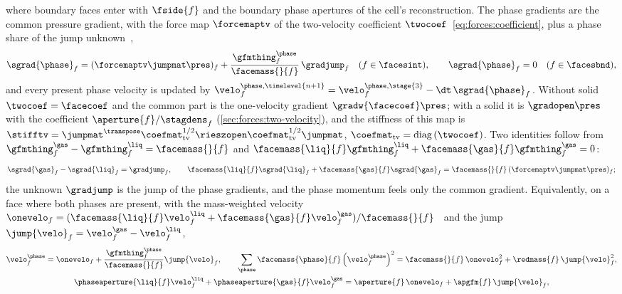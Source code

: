 where boundary faces enter with $\fside{f}$ and the boundary phase apertures
of the cell's reconstruction. The phase gradients are the common pressure
gradient, with the force map $\forcemaptv$ of the two-velocity coefficient
$\twocoef$~\cref{eq:forces:coefficient}, plus a phase share of the jump
unknown~,
\begin{equation}\label{eq:projection:phase-gradient}
  \sgrad{\phase}_f=(\forcemaptv\jumpmat\pres)_f+\frac{\gfmthing^{\phase}_f}{\facemass{}{f}}\,\gradjump_f
  \quad(f\in\facesint),\qquad \sgrad{\phase}_f=0\quad(f\in\facesbnd),
\end{equation}
and every present phase velocity is updated by
$\velo^{\phase,\timelevel{n+1}}_f=\velo^{\phase,\stage{3}}_f-\dt\,\sgrad{\phase}_f$.
Without solid $\twocoef=\facecoef$ and the common part is the one-velocity
gradient $\gradw{\facecoef}\pres$; with a solid it is $\gradopen\pres$ with
the coefficient $\aperture{f}/\stagdens_f$ (\cref{sec:forces:two-velocity}),
and the stiffness of this map is
$\stifftv=\jumpmat^{\transpose}\coefmat_{\mathrm{tv}}^{1/2}\rieszopen\coefmat_{\mathrm{tv}}^{1/2}\jumpmat$,
$\coefmat_{\mathrm{tv}}=\diag{\twocoef}$. Two identities follow from
$\gfmthing^{\gas}_f-\gfmthing^{\liq}_f=\facemass{}{f}$ and
$\facemass{\liq}{f}\gfmthing^{\liq}_f+\facemass{\gas}{f}\gfmthing^{\gas}_f=0$:
\begin{equation}\label{eq:projection:phase-identities}
  \sgrad{\gas}_f-\sgrad{\liq}_f=\gradjump_f,\qquad
  \facemass{\liq}{f}\sgrad{\liq}_f+\facemass{\gas}{f}\sgrad{\gas}_f=\facemass{}{f}\,(\forcemaptv\jumpmat\pres)_f ;
\end{equation}
the unknown $\gradjump$ is the jump of the phase gradients, and the phase
momentum feels only the common gradient. Equivalently, on a face where both
phases are present, with the mass-weighted velocity
$\onevelo_f=(\facemass{\liq}{f}\velo^{\liq}_f+\facemass{\gas}{f}\velo^{\gas}_f)/\facemass{}{f}$~
and the jump $\jump{\velo}_f=\velo^{\gas}_f-\velo^{\liq}_f$,
\begin{equation}\label{eq:projection:decomposition}
  \begin{gathered}
  \velo^{\phase}_f=\onevelo_f+\frac{\gfmthing^{\phase}_f}{\facemass{}{f}}\jump{\velo}_f,\qquad
  \sum_{\phase}\facemass{\phase}{f}\roundpar{\velo^{\phase}_f}^2=\facemass{}{f}\,\onevelo_f^2+\redmass{f}\,\jump{\velo}_f^2,\\
  \phaseaperture{\liq}{f}\velo^{\liq}_f+\phaseaperture{\gas}{f}\velo^{\gas}_f=\aperture{f}\,\onevelo_f+\apgfm{f}\,\jump{\velo}_f,
  \end{gathered}
\end{equation}
